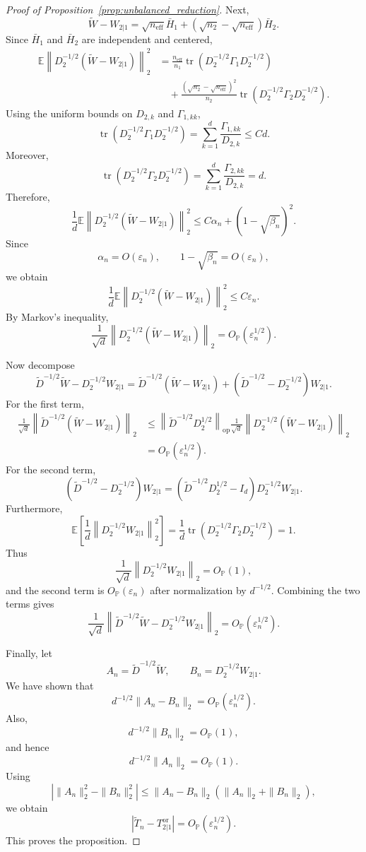 \documentclass[
  12pt]{article}
\theoremstyle{plain}
\theoremstyle{definition}
\theoremstyle{remark}
\begin{document}
\begin{proof}[Proof of Proposition~\ref{prop:unbalanced_reduction}]
Next,
\[
\widetilde W-W_{2|1}
=
\sqrt{n_{\mathrm{eff}}}\bar H_1
+
(\sqrt{n_2}-\sqrt{n_{\mathrm{eff}}})\bar H_2.
\]
Since \(\bar H_1\) and \(\bar H_2\) are independent and centered,
\[
\begin{aligned}
\mathbb E
\left\|
D_2^{-1/2}(\widetilde W-W_{2|1})
\right\|_2^2
&=
\frac{n_{\mathrm{eff}}}{n_1}
\operatorname{tr}
\left(
D_2^{-1/2}\Gamma_1D_2^{-1/2}
\right) \\
&\quad+
\frac{(\sqrt{n_2}-\sqrt{n_{\mathrm{eff}}})^2}{n_2}
\operatorname{tr}
\left(
D_2^{-1/2}\Gamma_2D_2^{-1/2}
\right).
\end{aligned}
\]
Using the uniform bounds on \(D_{2,k}\) and \(\Gamma_{1,kk}\),
\[
\operatorname{tr}
\left(
D_2^{-1/2}\Gamma_1D_2^{-1/2}
\right)
=
\sum_{k=1}^d
\frac{\Gamma_{1,kk}}{D_{2,k}}
\le Cd.
\]
Moreover,
\[
\operatorname{tr}
\left(
D_2^{-1/2}\Gamma_2D_2^{-1/2}
\right)
=
\sum_{k=1}^d
\frac{\Gamma_{2,kk}}{D_{2,k}}
=
d.
\]
Therefore,
\[
\frac1d
\mathbb E
\left\|
D_2^{-1/2}(\widetilde W-W_{2|1})
\right\|_2^2
\le
C\alpha_n+(1-\sqrt{\beta_n})^2.
\]
Since
\[
\alpha_n=O(\varepsilon_n),
\qquad
1-\sqrt{\beta_n}=O(\varepsilon_n),
\]
we obtain
\[
\frac1d
\mathbb E
\left\|
D_2^{-1/2}(\widetilde W-W_{2|1})
\right\|_2^2
\le
C\varepsilon_n.
\]
By Markov's inequality,
\[
\frac1{\sqrt d}
\left\|
D_2^{-1/2}(\widetilde W-W_{2|1})
\right\|_2
=
O_{\mathbb P}(\varepsilon_n^{1/2}).
\]

Now decompose
\[
\widetilde D^{-1/2}\widetilde W
-
D_2^{-1/2}W_{2|1}
=
\widetilde D^{-1/2}(\widetilde W-W_{2|1})
+
(\widetilde D^{-1/2}-D_2^{-1/2})W_{2|1}.
\]
For the first term,
\[
\begin{aligned}
\frac1{\sqrt d}
\left\|
\widetilde D^{-1/2}(\widetilde W-W_{2|1})
\right\|_2
&\le
\left\|
\widetilde D^{-1/2}D_2^{1/2}
\right\|_{\mathrm{op}}
\frac1{\sqrt d}
\left\|
D_2^{-1/2}(\widetilde W-W_{2|1})
\right\|_2 \\
&=
O_{\mathbb P}(\varepsilon_n^{1/2}).
\end{aligned}
\]
For the second term,
\[
(\widetilde D^{-1/2}-D_2^{-1/2})W_{2|1}
=
(\widetilde D^{-1/2}D_2^{1/2}-I_d)D_2^{-1/2}W_{2|1}.
\]
Furthermore,
\[
\mathbb E
\left[
\frac1d
\left\|
D_2^{-1/2}W_{2|1}
\right\|_2^2
\right]
=
\frac1d
\operatorname{tr}
\left(
D_2^{-1/2}\Gamma_2D_2^{-1/2}
\right)
=
1.
\]
Thus
\[
\frac1{\sqrt d}
\left\|
D_2^{-1/2}W_{2|1}
\right\|_2
=
O_{\mathbb P}(1),
\]
and the second term is \(O_{\mathbb P}(\varepsilon_n)\) after normalization by
\(d^{-1/2}\).  Combining the two terms gives
\[
\frac1{\sqrt d}
\left\|
\widetilde D^{-1/2}\widetilde W
-
D_2^{-1/2}W_{2|1}
\right\|_2
=
O_{\mathbb P}(\varepsilon_n^{1/2}).
\]

Finally, let
\[
A_n=\widetilde D^{-1/2}\widetilde W,
\qquad
B_n=D_2^{-1/2}W_{2|1}.
\]
We have shown that
\[
d^{-1/2}\|A_n-B_n\|_2
=
O_{\mathbb P}(\varepsilon_n^{1/2}).
\]
Also,
\[
d^{-1/2}\|B_n\|_2
=
O_{\mathbb P}(1),
\]
and hence
\[
d^{-1/2}\|A_n\|_2
=
O_{\mathbb P}(1).
\]
Using
\[
\left|
\|A_n\|_2^2-\|B_n\|_2^2
\right|
\le
\|A_n-B_n\|_2
\left(
\|A_n\|_2+\|B_n\|_2
\right),
\]
we obtain
\[
\left|
\widetilde T_n-T_{2|1}^{\mathrm{or}}
\right|
=
O_{\mathbb P}(\varepsilon_n^{1/2}).
\]
This proves the proposition.
\end{proof}
\end{document}
